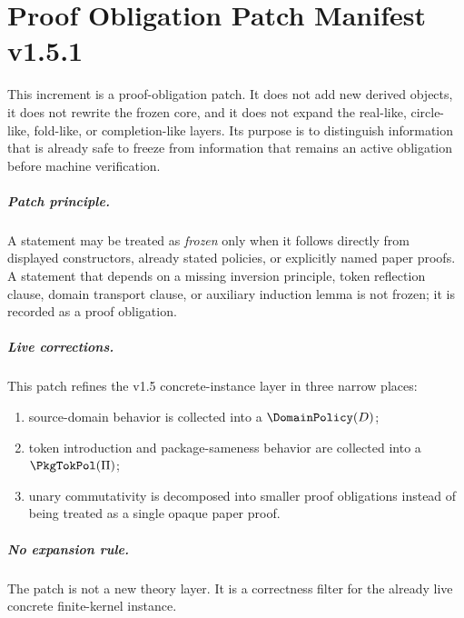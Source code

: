 \chapter{Proof Obligation Patch Manifest v1.5.1}
\label{ch:v151-manifest}

This increment is a proof-obligation patch. It does not add new derived objects, it does not rewrite the frozen core, and it does not expand the real-like, circle-like, fold-like, or completion-like layers. Its purpose is to distinguish information that is already safe to freeze from information that remains an active obligation before machine verification.

\paragraph{Patch principle.}
A statement may be treated as \emph{frozen} only when it follows directly from displayed constructors, already stated policies, or explicitly named paper proofs. A statement that depends on a missing inversion principle, token reflection clause, domain transport clause, or auxiliary induction lemma is not frozen; it is recorded as a proof obligation.

\paragraph{Live corrections.}
This patch refines the v1.5 concrete-instance layer in three narrow places:
\begin{enumerate}
  \item source-domain behavior is collected into a \(\DomainPolicy(D)\);
  \item token introduction and package-sameness behavior are collected into a \(\PkgTokPol(\Pi)\);
  \item unary commutativity is decomposed into smaller proof obligations instead of being treated as a single opaque paper proof.
\end{enumerate}

\paragraph{No expansion rule.}
The patch is not a new theory layer. It is a correctness filter for the already live concrete finite-kernel instance.
